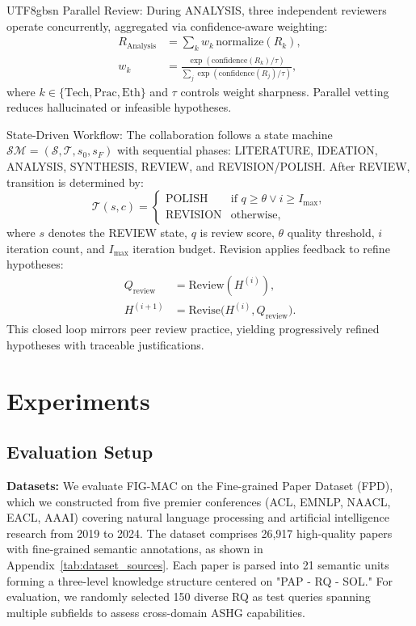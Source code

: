 \documentclass[11pt]{article}
\begin{document}
\begin{CJK}{UTF8}{gbsn}
Parallel Review: During ANALYSIS, three independent reviewers operate concurrently, aggregated via confidence-aware weighting:
\begin{align}
    R_{\text{Analysis}} &= \sum_{k} w_k\, \text{normalize}(R_k), \\
    w_k &= \frac{\exp(\text{confidence}(R_k)/\tau)}{\sum_j \exp(\text{confidence}(R_j)/\tau)},
\end{align}
where $k \in \{\text{Tech},\text{Prac},\text{Eth}\}$ and $\tau$ controls weight sharpness. Parallel vetting reduces hallucinated or infeasible hypotheses.

State-Driven Workflow: The collaboration follows a state machine $\mathcal{SM}=(\mathcal{S},\mathcal{T},s_0,s_F)$ with sequential phases: LITERATURE, IDEATION, ANALYSIS, SYNTHESIS, REVIEW, and REVISION/POLISH. After REVIEW, transition is determined by:
\begin{equation}
    \mathcal{T}(s, c) =
    \begin{cases}
        \text{POLISH} & \text{if } q \geq \theta \lor i \geq I_{\max}, \\
        \text{REVISION} & \text{otherwise},
    \end{cases}
\end{equation}
where $s$ denotes the REVIEW state, $q$ is review score, $\theta$ quality threshold, $i$ iteration count, and $I_{\max}$ iteration budget. Revision applies feedback to refine hypotheses:
\begin{align}
    Q_{\text{review}} &= \text{Review}(H^{(i)}), \\
    H^{(i+1)} &= \text{Revise}\big(H^{(i)}, Q_{\text{review}}\big).
\end{align}
This closed loop mirrors peer review practice, yielding progressively refined hypotheses with traceable justifications.

\section{Experiments}
\subsection{Evaluation Setup}

\textbf{Datasets:} We evaluate FIG-MAC on the Fine-grained Paper Dataset (FPD), which we constructed from five premier conferences (ACL, EMNLP, NAACL, EACL, AAAI) covering natural language processing and artificial intelligence research from 2019 to 2024. The dataset comprises 26,917 high-quality papers with fine-grained semantic annotations, as shown in Appendix~\ref{tab:dataset_sources}. Each paper is parsed into 21 semantic units forming a three-level knowledge structure centered on "PAP - RQ - SOL." For evaluation, we randomly selected 150 diverse RQ as test queries spanning multiple subfields to assess cross-domain ASHG capabilities.


\end{CJK}
\end{document}
